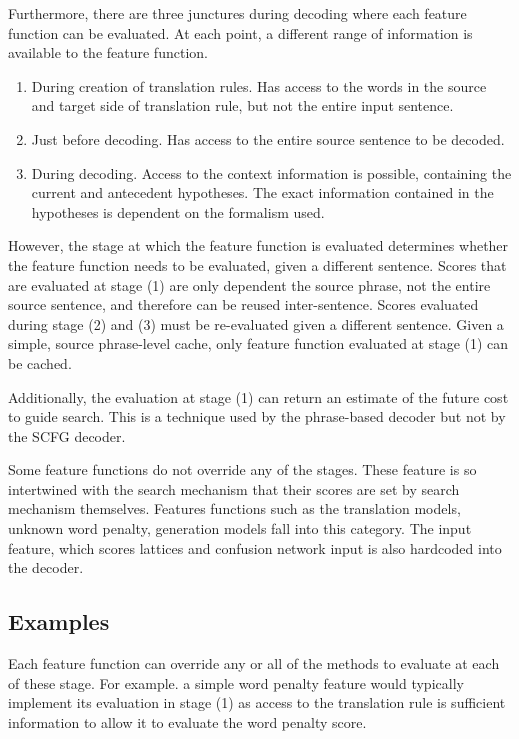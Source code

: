 \documentclass{pbml}
\begin{document}
Furthermore, there are three junctures during decoding where each feature function can be evaluated. At each point, a different range of information is available to the feature function. 
\begin{enumerate}
    \item During creation of translation rules. Has access to the words in the source and target side of translation rule, but not the entire input sentence.
    \item Just before decoding. Has access to the entire source sentence to be decoded.
    \item During decoding. Access to the context information is possible, containing the current and antecedent hypotheses. The exact information contained in the hypotheses is dependent on the formalism used.
\end{enumerate}
However, the stage at which the feature function is evaluated determines whether the feature function needs to be evaluated, given a different sentence. Scores that are evaluated at stage (1) are only dependent the source phrase, not the entire source sentence, and therefore can be reused inter-sentence. Scores evaluated during stage (2) and (3) must be re-evaluated given a different sentence. Given a simple, source phrase-level cache, only feature function evaluated at stage (1) can be cached.

Additionally, the evaluation at stage (1) can return an estimate of the future cost to guide search. This is a technique used by the phrase-based decoder but not by the SCFG decoder.

Some feature functions do not override any of the stages. These feature is so intertwined with the search mechanism that their scores are set by search mechanism themselves. Features functions such as the translation models, unknown word penalty,  generation models fall into this category. The input feature, which scores lattices and confusion network input is also hardcoded into the decoder.

\subsection{Examples}

Each feature function can override any or all of the methods to evaluate at each of these stage. For example. a simple word penalty feature would typically implement its evaluation in stage (1) as access to the translation rule is sufficient information to allow it to evaluate the word penalty score.
\end{document}
